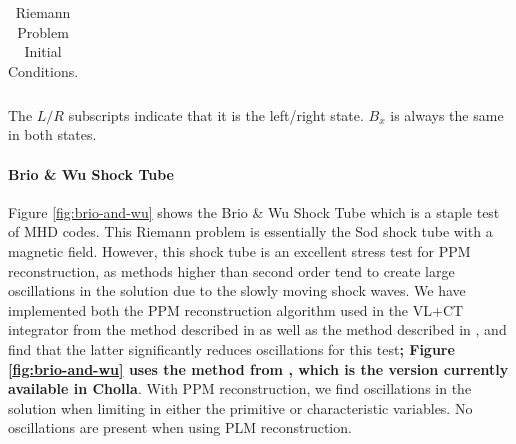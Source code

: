 \documentclass[modern, linenumbers]{aastex631}
\begin{document}
\begin{table}
\begin{tabular}{lcccccccc}
    
    
    \end{tabular}
    \caption{Riemann Problem Initial Conditions.} The $L/R$ subscripts indicate that it is the left/right state. $B_x$ is always the same in both states.
    \label{table:riemann}
\end{table}

\paragraph{Brio \& Wu Shock Tube}
Figure \ref{fig:brio-and-wu} shows the Brio \& Wu Shock Tube \citep{brio_wu_1988} which is a staple test of MHD codes. This Riemann problem is essentially the Sod shock tube \citep{sod_1978} with a magnetic field. However, this shock tube is an excellent stress test for PPM reconstruction, as methods higher than second order tend to create large oscillations in the solution due to the slowly moving shock waves. We have implemented both the PPM reconstruction algorithm used in the VL+CT integrator from the method described in \cite{stone_athena_2008} as well as the method described in \cite{felker_2018}, and find that the latter significantly reduces oscillations for this test\textbf{; Figure \ref{fig:brio-and-wu} uses the method from \cite{felker_2018}, which is the version currently available in Cholla}. With PPM reconstruction, we find  oscillations in the solution when limiting in either the primitive or characteristic variables. No oscillations are present when using PLM reconstruction.
\end{document}
